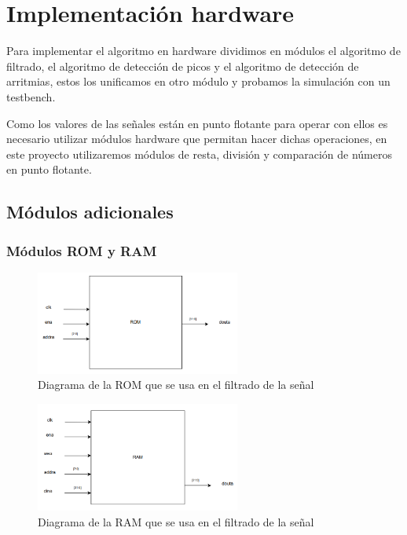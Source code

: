 \chapter{Implementación hardware}

Para implementar el algoritmo en hardware dividimos en módulos el algoritmo de filtrado, el algoritmo
de detección de picos y el algoritmo de detección de arritmias, estos los unificamos en otro módulo 
y probamos la simulación con un testbench.

Como los valores de las señales están en punto flotante para operar con ellos es necesario utilizar módulos
hardware que permitan hacer dichas operaciones, en este proyecto utilizaremos módulos de resta, división y 
comparación de números en punto flotante.

\section{Módulos adicionales} 
\subsection{Módulos ROM y RAM}

\begin{figure}[h!]
    \centering
    \includegraphics[width=0.6\textwidth]{./Images/img_implementacion_hw/diagramamoduloROM.png}
    \caption{Diagrama de la ROM que se usa en el filtrado de la señal}
    \label{fig:diagramamoduloROM}
\end{figure} 

\begin{figure}[h!]
    \centering
    \includegraphics[width=0.6\textwidth]{./Images/img_implementacion_hw/diagramamoduloRAM.png}
    \caption{Diagrama de la RAM que se usa en el filtrado de la señal}
    \label{fig:diagramamoduloRAM}
\end{figure} 


